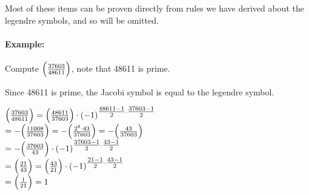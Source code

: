 \documentclass[../main.tex]{subfiles}
\begin{document}
Most of these items can be proven directly from rules we have derived about the legendre symbols, and so will be omitted.

\paragraph{Example:} Compute $\Big(\frac{37603}{48611}\Big)$, note that 48611 is prime.
\begin{ans}
    Since 48611 is prime, the Jacobi symbol is equal to the legendre symbol.
    \begin{center}
        $\Big(\frac{37603}{48611}\Big)=\Big(\frac{48611}{37603}\Big)\cdot(-1)^{\tfrac{48611-1}{2}\cdot\tfrac{37603-1}{2}}$ \\
        $=-\Big(\frac{11008}{37603}\Big)=-\Big(\frac{2^8\cdot43}{37603}\Big)=-\Big(\frac{43}{37603}\Big)$ \\
        $=-\Big(\frac{37603}{43}\Big)\cdot(-1)^{\tfrac{37603-1}{2}\cdot\tfrac{43-1}{2}}$ \\
        $=\Big(\frac{21}{43}\Big)=\Big(\frac{43}{21}\Big)\cdot(-1)^{\tfrac{21-1}{2}\cdot\tfrac{43-1}{2}}$ \\
        $=\Big(\frac{1}{21}\Big)=1$
    \end{center}
\end{ans}
\end{document}
